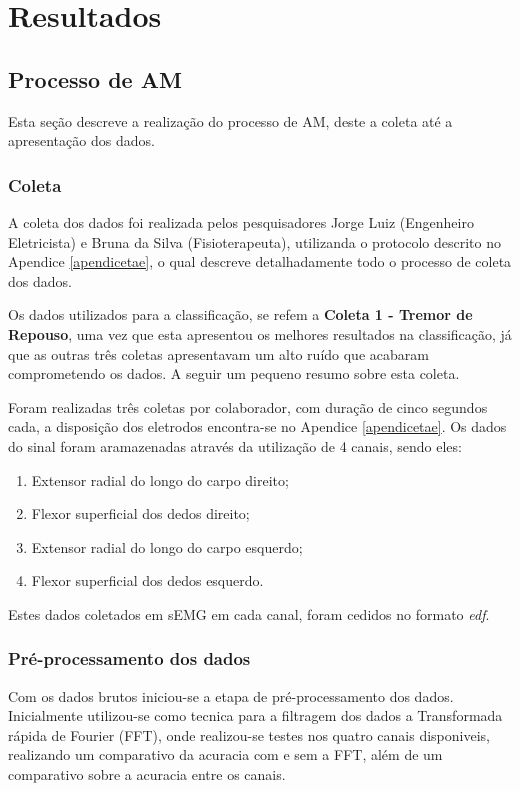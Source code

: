 \chapter{Resultados}
\label{ch:Resultados}
\section{Processo de AM}
Esta seção descreve a realização do processo de AM, deste a coleta até a apresentação dos dados.
\subsection{Coleta}
A coleta dos dados foi realizada pelos pesquisadores Jorge Luiz (Engenheiro Eletricista) e Bruna da Silva (Fisioterapeuta), utilizanda o protocolo descrito no Apendice \ref{apendicetae}, o qual descreve detalhadamente todo o processo de coleta dos dados.

Os dados utilizados para a classificação, se refem a \textbf{Coleta 1 - Tremor de Repouso}, uma vez que esta apresentou os melhores resultados na classificação, já que as outras três coletas apresentavam um alto ruído que acabaram comprometendo os dados. A seguir um pequeno resumo sobre esta coleta.

Foram realizadas três coletas por colaborador, com duração de cinco segundos cada, a disposição dos eletrodos encontra-se no Apendice \ref{apendicetae}. Os dados do sinal foram aramazenadas através da utilização de 4 canais, sendo eles:
\begin{enumerate}
    \item Extensor radial do longo do carpo direito;
    \item Flexor superficial dos dedos direito;
    \item Extensor radial do longo do carpo esquerdo;
    \item Flexor superficial dos dedos esquerdo.
\end{enumerate}

Estes dados coletados em sEMG em cada canal, foram cedidos no formato \textit{edf}.

\subsection{Pré-processamento dos dados}
Com os dados brutos iniciou-se a etapa de pré-processamento dos dados. Inicialmente utilizou-se como tecnica para a filtragem dos dados a Transformada rápida de Fourier (FFT), onde realizou-se testes nos quatro canais disponiveis, realizando um comparativo da acuracia com e sem a FFT, além de um comparativo sobre a acuracia entre os canais. 

